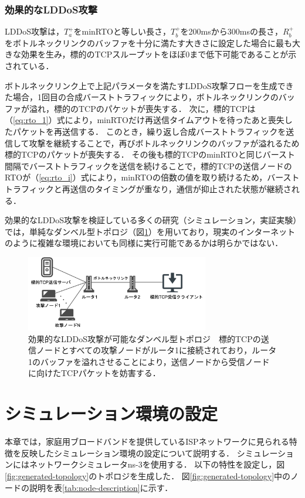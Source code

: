 \documentclass[Japanese]{dicomopapers}
\begin{document}
\subsubsection{効果的なLDDoS攻撃}
LDDoS攻撃は，$T_a^+$をminRTOと等しい長さ，$T_b^+$を200msから300msの長さ，$R_b^+$をボトルネックリンクのバッファを十分に満たす大きさに設定した場合に最も大きな効果を生み，標的のTCPスループットをほぼ0まで低下可能であることが示されている\cite{ldos}\cite{practical-ldos-defense}．

ボトルネックリンク上で上記パラメータを満たすLDDoS攻撃フローを生成できた場合，1回目の合成バーストトラフィックにより，ボトルネックリンクのバッファが溢れ，標的のTCPのパケットが喪失する．
次に，標的TCPは（\ref{eq:rto_1}）式により，minRTOだけ再送信タイムアウトを待ったあと喪失したパケットを再送信する．
このとき，繰り返し合成バーストトラフィックを送信して攻撃を継続することで，再びボトルネックリンクのバッファが溢れるため標的TCPのパケットが喪失する．
その後も標的TCPのminRTOと同じバースト間隔でバーストトラフィックを送信を続けることで，標的TCPの送信ノードのRTOが（\ref{eq:rto_i}）式により，minRTOの倍数の値を取り続けるため，バーストトラフィックと再送信のタイミングが重なり，通信が抑止された状態が継続される．

効果的なLDDoS攻撃を検証している多くの研究（シミュレーション\cite{ldos}\cite{cpr2}\cite{lddos-flow-aggregation}，実証実験\cite{mine-wip-paper}）では，単純なダンベル型トポロジ（図\ref{fig:dumbbell-topology}）を用いており，現実のインターネットのように複雑な環境においても同様に実行可能であるかは明らかではない．

\begin{figure}[tb]
    \begin{center}
        \includegraphics[clip,width=8.0cm]{images/dumbbell.png}
        \caption{効果的なLDDoS攻撃が可能なダンベル型トポロジ　標的TCPの送信ノードとすべての攻撃ノードがルータ1に接続されており，ルータ1のバッファを溢れさせることにより，送信ノードから受信ノードに向けたTCPパケットを妨害する．}
        \label{fig:dumbbell-topology}
    \end{center}
\end{figure}

\section{シミュレーション環境の設定}
本章では，家庭用ブロードバンドを提供しているISPネットワークに見られる特徴を反映したシミュレーション環境の設定について説明する．
シミュレーションにはネットワークシミュレータns-3\cite{ns-3}を使用する．
以下の特性を設定し，図\ref{fig:generated-topology}のトポロジを生成した．
図\ref{fig:generated-topology}中のノードの説明を表\ref{tab:node-description}に示す．
\end{document}
